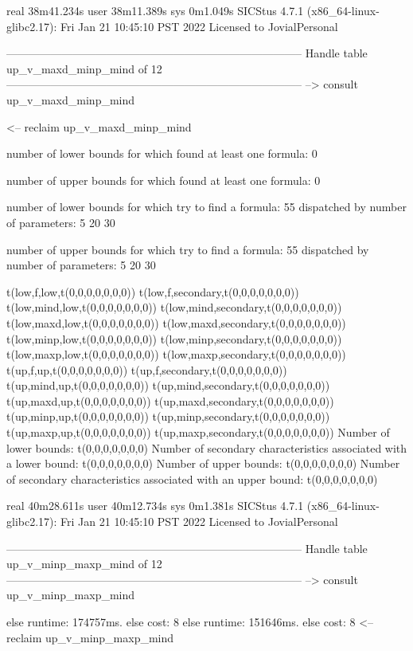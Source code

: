 real	38m41.234s
user	38m11.389s
sys	0m1.049s
SICStus 4.7.1 (x86_64-linux-glibc2.17): Fri Jan 21 10:45:10 PST 2022
Licensed to JovialPersonal


--------------------------------------------------------------------------------
Handle table up_v_maxd_minp_mind of 12
--------------------------------------------------------------------------------
--> consult up_v_maxd_minp_mind

<-- reclaim up_v_maxd_minp_mind

number of lower bounds for which found at least one formula: 0

number of upper bounds for which found at least one formula: 0

number of lower bounds for which try to find a formula: 55
dispatched by number of parameters: 5  20  30

number of upper bounds for which try to find a formula: 55
dispatched by number of parameters: 5  20  30

t(low,f,low,t(0,0,0,0,0,0,0))
t(low,f,secondary,t(0,0,0,0,0,0,0))
t(low,mind,low,t(0,0,0,0,0,0,0))
t(low,mind,secondary,t(0,0,0,0,0,0,0))
t(low,maxd,low,t(0,0,0,0,0,0,0))
t(low,maxd,secondary,t(0,0,0,0,0,0,0))
t(low,minp,low,t(0,0,0,0,0,0,0))
t(low,minp,secondary,t(0,0,0,0,0,0,0))
t(low,maxp,low,t(0,0,0,0,0,0,0))
t(low,maxp,secondary,t(0,0,0,0,0,0,0))
t(up,f,up,t(0,0,0,0,0,0,0))
t(up,f,secondary,t(0,0,0,0,0,0,0))
t(up,mind,up,t(0,0,0,0,0,0,0))
t(up,mind,secondary,t(0,0,0,0,0,0,0))
t(up,maxd,up,t(0,0,0,0,0,0,0))
t(up,maxd,secondary,t(0,0,0,0,0,0,0))
t(up,minp,up,t(0,0,0,0,0,0,0))
t(up,minp,secondary,t(0,0,0,0,0,0,0))
t(up,maxp,up,t(0,0,0,0,0,0,0))
t(up,maxp,secondary,t(0,0,0,0,0,0,0))
Number of lower bounds:                                             t(0,0,0,0,0,0,0)
Number of secondary characteristics associated with a lower bound:  t(0,0,0,0,0,0,0)
Number of upper bounds:                                             t(0,0,0,0,0,0,0)
Number of secondary characteristics associated with an upper bound: t(0,0,0,0,0,0,0)

real	40m28.611s
user	40m12.734s
sys	0m1.381s
SICStus 4.7.1 (x86_64-linux-glibc2.17): Fri Jan 21 10:45:10 PST 2022
Licensed to JovialPersonal


--------------------------------------------------------------------------------
Handle table up_v_minp_maxp_mind of 12
--------------------------------------------------------------------------------
--> consult up_v_minp_maxp_mind

else runtime: 174757ms. else cost: 8
else runtime: 151646ms. else cost: 8
<-- reclaim up_v_minp_maxp_mind

